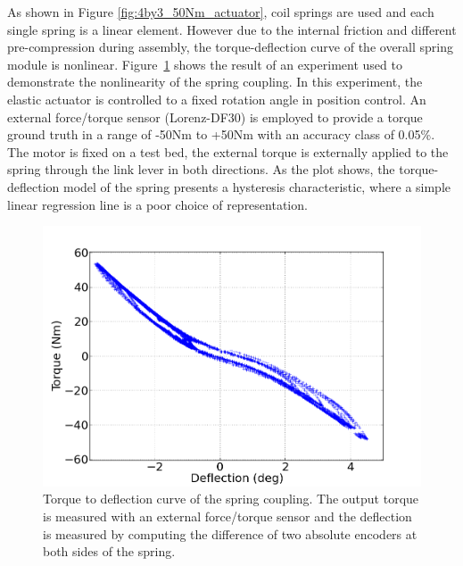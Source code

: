 As shown in Figure \ref{fig:4by3_50Nm_actuator},  coil springs are used and each single spring is a linear element. However due to the internal friction and different pre-compression during assembly, the torque-deflection curve of the overall spring module is nonlinear. Figure~\ref{fig:Spring_torque_curve_2D} shows the result of an experiment used to demonstrate the nonlinearity of the spring coupling. In this experiment, the elastic actuator is controlled to a fixed rotation angle in position control. An external force/torque sensor (Lorenz-DF30) is employed to provide a torque ground truth in a range of -50Nm to +50Nm with an accuracy class of 0.05\%.  The motor is fixed on a test bed, the external torque is externally applied to the spring through the link lever in both directions. As the plot shows, the torque-deflection model of the spring presents a hysteresis characteristic, where a simple linear regression line is a poor choice of representation.

\begin{figure}[htb]
\centering
\advance\leftskip 0.3cm
\includegraphics[width=0.9\columnwidth]{./images/spring_static_analysis.png}
 \caption{Torque to deflection curve of the spring coupling. The output torque is measured with an external force/torque sensor and the deflection is measured by computing the difference of two absolute encoders at both sides of the spring.}
 \label{fig:Spring_torque_curve_2D}
\end{figure}
